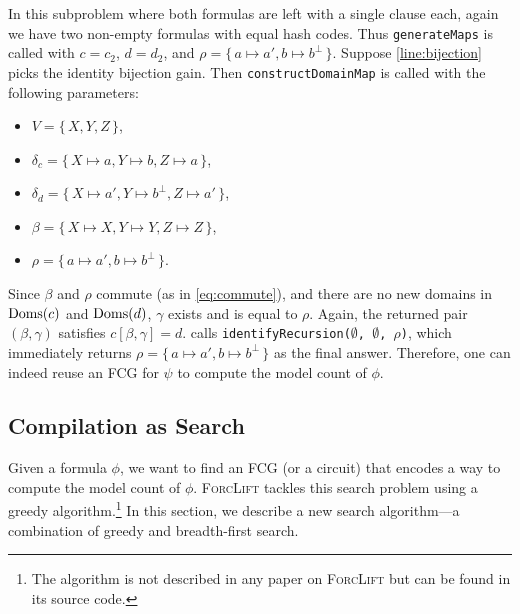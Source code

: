 \begin{example}
  In this subproblem where both formulas are left with a single clause each,
  again we have two non-empty formulas with equal hash codes. Thus
  \texttt{generateMaps} is called with $c = c_2$, $d = d_2$, and
  $\rho = \{\, a \mapsto a', b \mapsto b^\bot \,\}$. Suppose
  \cref{line:bijection} picks the identity bijection gain. Then
  \texttt{constructDomainMap} is called with the following parameters:
  \begin{itemize}
    \item $V = \{\, X, Y, Z \,\}$,
    \item $\delta_c = \{\, X \mapsto a, Y \mapsto b, Z \mapsto a \,\}$,
    \item $\delta_d = \{\, X \mapsto a', Y \mapsto b^\bot, Z \mapsto a' \,\}$,
    \item $\beta = \{\, X \mapsto X, Y \mapsto Y, Z \mapsto Z \,\}$,
    \item $\rho = \{\, a \mapsto a', b \mapsto b^\bot \,\}$.
  \end{itemize}
  Since $\beta$ and $\rho$ commute (as in \cref{eq:commute}), and there are no
  new domains in $\operatorname{Doms}(c)$ and $\operatorname{Doms}(d)$, $\gamma$ exists and is equal to
  $\rho$. Again, the returned pair $(\beta, \gamma)$ satisfies
  $c[\beta, \gamma] = d$.  calls
  \texttt{identifyRecursion($\emptyset$, $\emptyset$, $\rho$)}, which
  immediately returns $\rho = \{\, a \mapsto a', b \mapsto b^\bot \,\}$ as the
  final answer. Therefore, one can indeed reuse an FCG for $\psi$ to compute the
  model count of $\phi$.
\end{example}

\subsection{Compilation as Search}


Given a formula $\phi$, we want to find an FCG (or a circuit) that encodes a way
to compute the model count of $\phi$. \textsc{ForcLift}
\citep{DBLP:conf/ijcai/BroeckTMDR11} tackles this search problem using a greedy
algorithm.\footnote{The algorithm is not described in any paper on
  \textsc{ForcLift} but can be found in its source code.} In this section, we
describe a new search algorithm---a combination of greedy and breadth-first
search.

